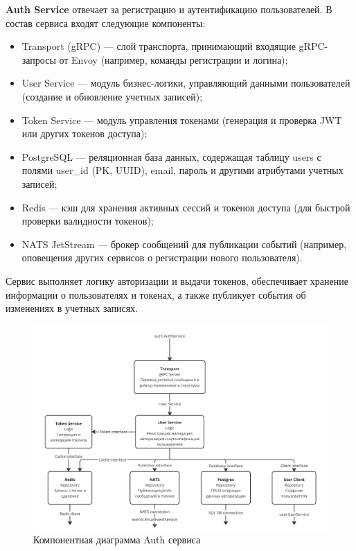 \textbf{Auth Service} отвечает за регистрацию и аутентификацию пользователей. В состав сервиса входят следующие компоненты:
\begin{itemize}
    \item Transport (gRPC) — слой транспорта, принимающий входящие gRPC-запросы от Envoy (например, команды регистрации и логина);
    \item User Service — модуль бизнес-логики, управляющий данными пользователей (создание и обновление учетных записей);
    \item Token Service — модуль управления токенами (генерация и проверка JWT или других токенов доступа);
    \item PostgreSQL — реляционная база данных, содержащая таблицу users с полями user\_id (PK, UUID), email, пароль и другими атрибутами учетных записей;
    \item Redis — кэш для хранения активных сессий и токенов доступа (для быстрой проверки валидности токенов);
    \item NATS JetStream — брокер сообщений для публикации событий (например, оповещения других сервисов о регистрации нового пользователя).
\end{itemize}
\noindent Сервис выполняет логику авторизации и выдачи токенов, обеспечивает хранение информации о пользователях и токенах, а также публикует события об изменениях в учетных записях.
\begin{figure}[H]
        \centering
        \includegraphics[width=0.8\linewidth]{Images/second_chapter_backend_architecture/Picture3.png}
        \caption{Компонентная диаграмма Auth сервиса}
        \label{fig:auth-service-component-diagram}
\end{figure}

